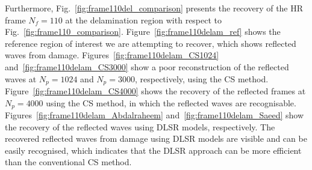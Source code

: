 Furthermore, Fig.~\ref{fig:frame110del_comparison} presents the recovery of the HR frame $N_f=110$ at the delamination region with respect to Fig.~\ref{fig:frame110_comparison}.
Figure~\ref{fig:frame110delam_ref} shows the reference region of interest we are attempting to recover, which shows reflected waves from damage.
Figures~\ref{fig:frame110delam_CS1024} and~\ref{fig:frame110delam_CS3000} show a poor reconstruction of the reflected waves at $N_p=1024$ and $N_p=3000$, respectively, using the CS method.
Figure~\ref{fig:frame110delam_CS4000} shows the recovery of the reflected frames at $N_p=4000$ using the CS method, in which the reflected waves are recognisable.
Figures~\ref{fig:frame110delam_Abdalraheem} and~\ref{fig:frame110delam_Saeed} show the recovery of the reflected waves using DLSR models, respectively.
The recovered reflected waves from damage using DLSR models are visible and can be easily recognised, which indicates that the DLSR approach can be more efficient than the conventional CS method. 

